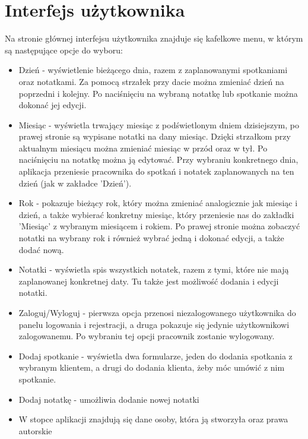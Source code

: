 \documentclass[eng,printmode,openany,oneside]{mgr}
\begin{document}
\section{Interfejs użytkownika}

Na stronie głównej interfejsu użytkownika znajduje się kafelkowe menu, w którym są następujące opcje do wyboru:
\begin{itemize}
	\item Dzień - wyświetlenie bieżącego dnia, razem z zaplanowanymi spotkaniami oraz notatkami. Za pomocą strzałek przy dacie można zmieniać dzień na poprzedni i kolejny. Po naciśnięciu na wybraną notatkę lub spotkanie można dokonać jej edycji.
	\item Miesiąc - wyświetla trwający miesiąc z podświetlonym dniem dzisiejszym, po prawej stronie są wypisane notatki na dany miesiąc. Dzięki strzałkom przy aktualnym miesiącu można zmieniać miesiąc w przód oraz w tył. Po naciśnięciu na notatkę można ją edytować. Przy wybraniu konkretnego dnia, aplikacja przeniesie pracownika do spotkań i notatek zaplanowanych na ten dzień (jak w zakładce 'Dzień').
	\item Rok - pokazuje bieżący rok, który można zmieniać analogicznie jak miesiąc i dzień, a także wybierać konkretny miesiąc, który przeniesie nas do zakładki 'Miesiąc' z wybranym miesiącem i rokiem. Po prawej stronie można zobaczyć notatki na wybrany rok i również wybrać jedną i dokonać edycji, a także dodać nową.
	\item Notatki - wyświetla spis wszystkich notatek, razem z tymi, które nie mają zaplanowanej konkretnej daty. Tu także jest możliwość dodania i edycji notatki.
	\item Zaloguj/Wyloguj - pierwsza opcja przenosi niezalogowanego użytkownika do panelu logowania i rejestracji, a druga pokazuje się jedynie użytkownikowi zalogowanemu. Po wybraniu tej opcji pracownik zostanie wylogowany.
	\item Dodaj spotkanie - wyświetla dwa formularze, jeden do dodania spotkania z wybranym klientem, a drugi do dodania klienta, żeby móc umówić z nim spotkanie.
	\item Dodaj notatkę - umożliwia dodanie nowej notatki
	\item W stopce aplikacji znajdują się dane osoby, która ją stworzyła oraz prawa autorskie
	
\end {itemize}




\newpage
\end{document}
